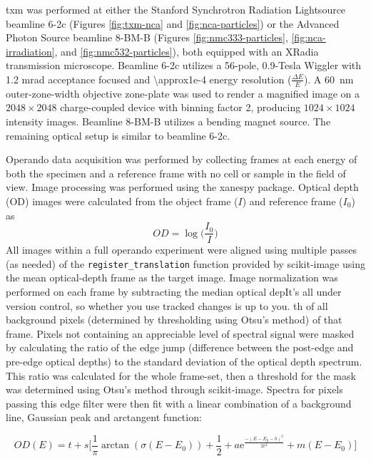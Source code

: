 \documentclass{article}
\begin{document}
\gls{txm} was performed at either the Stanford Synchrotron Radiation
Lightsource beamline 6-2c (Figures \ref{fig:txm-nca} and
\ref{fig:nca-particles}) or the Advanced Photon Source beamline 8-BM-B
(Figures \ref{fig:nmc333-particles}, \ref{fig:nca-irradiation}, and
\ref{fig:nmc532-particles}), both equipped with an XRadia transmission
microscope. Beamline 6-2c utilizes a 56-pole, 0.9-Tesla Wiggler with
1.2 mrad acceptance focused and \num{\approx1e-4} energy resolution
($\frac{\Delta E}{E}$). A \SI{60}{nm} outer-zone-width objective
zone-plate was used to render a magnified image on a $2048 \times
2048$ charge-coupled device with binning factor 2, producing $1024
\times 1024$ intensity images. Beamline 8-BM-B utilizes a bending
magnet source. The remaining optical setup is similar to beamline
6-2c.

Operando data acquisition was performed by collecting frames at each
energy of both the specimen and a reference frame with no cell or
sample in the field of view. Image processing was performed using the
xanespy package\cite{xanespy}. Optical depth (OD) images were
calculated from the object frame ($I$) and reference frame ($I_0$) as
$$OD = \log{\big(\frac{I_0}{I}\big)}$$ All images within a full
operando experiment were aligned using multiple passes (as needed) of
the \texttt{register\_translation} function provided by
scikit-image\cite{walt2014} using the mean optical-depth frame as the
target image. Image normalization was performed on each frame by
subtracting the median optical depIt's all under version control, so whether you use tracked changes is
up to you.
th of all background pixels
(determined by thresholding using Otsu's method\cite{otsu1979}) of
that frame\cite{jin2015}. Pixels not containing an appreciable level
of  spectral signal were masked by calculating the ratio of the
edge jump (difference between the post-edge and pre-edge optical
depths) to the standard deviation of the optical depth spectrum. This
ratio was calculated for the whole frame-set, then a threshold for the
mask was determined using Otsu's method\cite{otsu1979} through
scikit-image\cite{walt2014}. Spectra for pixels passing this edge
filter were then fit with a linear combination of a background line,
Gaussian peak and arctangent function:

\begin{equation}
  OD(E) = t + s\bigg[\frac{1}{\pi}\arctan(\sigma (E-E_0)) + \frac{1}{2} +
    a\mathrm{e}^{\frac{-(E-E_0-b)^2}{2c^2}} + m(E-E_0)\bigg]
  \label{eq:kedge-fitting}
\end{equation}
\end{document}
